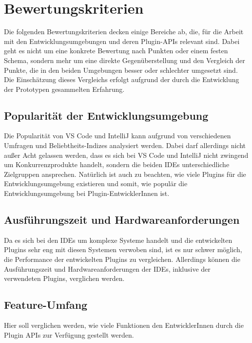 \chapter{Bewertungskriterien}
\label{cha:Kriterien}

Die folgenden Bewertungskriterien decken einige Bereiche ab,
die, für die Arbeit mit den Entwicklungsumgebungen
und deren Plugin-APIs relevant sind. Dabei geht es nicht um eine 
konkrete Bewertung nach Punkten oder einem festen Schema, sondern mehr
um eine direkte Gegenüberstellung und den Vergleich der Punkte,
die in den beiden Umgebungen besser oder schlechter 
umgesetzt sind. Die Einschätzung dieses Vergleichs erfolgt aufgrund
der durch die Entwicklung der Prototypen gesammelten Erfahrung.

\section{Popularität der Entwicklungsumgebung} 
\label{sec:Kriterien_Popularität}    
Die Popularität von VS Code und IntelliJ kann aufgrund
von verschiedenen Umfragen und Beliebtheits-Indizes 
analysiert werden. Dabei darf allerdings nicht außer
Acht gelassen werden, dass es sich bei VS Code und
IntelliJ nicht zwingend um Konkurrenzprodukte handelt,
sondern die beiden IDEs unterschiedliche Zielgruppen ansprechen.
Natürlich ist auch zu beachten, wie viele Plugins 
für die Entwicklungsumgebung existieren und somit, wie 
populär die Entwicklungsumgebung bei Plugin-EntwicklerInnen ist. 

\section{Ausführungszeit und Hardwareanforderungen} 
\label{sec:Kriterien_Performance}    
Da es sich bei den IDEs um komplexe Systeme handelt und die 
entwickelten Plugins sehr eng mit diesen Systemen verwoben sind,
ist es nur schwer möglich, die Performance der entwickelten
Plugins zu vergleichen. Allerdings können die Ausführungszeit und Hardwareanforderungen 
der IDEs, inklusive der verwendeten Plugins, verglichen werden.

\section{Feature-Umfang} 
\label{sec:Kriterien_FeatureUmfang}    
Hier soll verglichen werden, wie viele Funktionen
den EntwicklerInnen durch die Plugin APIs 
zur Verfügung gestellt werden.

